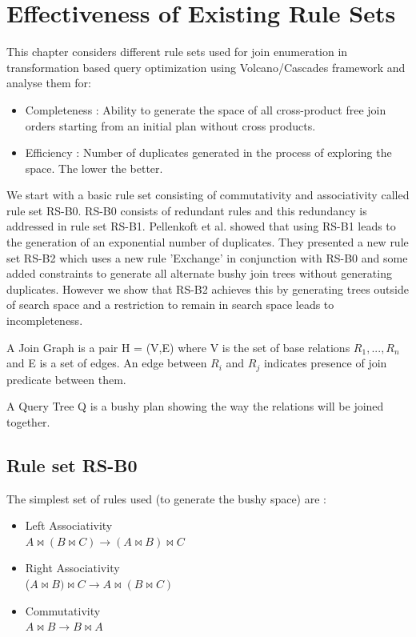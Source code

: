 \chapter{Effectiveness of Existing Rule Sets}
This chapter considers different rule sets used for join enumeration in transformation based query optimization using Volcano/Cascades framework and analyse them for:  
\begin{itemize}
	\item Completeness : Ability to generate the space of all cross-product free join orders starting from an initial plan without cross products.
	\item Efficiency : Number of duplicates generated in the process of exploring the space. The lower the better.
\end{itemize}

We start with a basic rule set consisting of commutativity and associativity called rule set RS-B0. RS-B0 consists of redundant rules  and this redundancy is addressed in rule set RS-B1. Pellenkoft et al.\cite{pellenkoft1997complexity} showed that using RS-B1 leads to the generation of an exponential number of duplicates. They presented a new rule set RS-B2 which uses a new rule 'Exchange' in conjunction with RS-B0 and some added constraints to generate all alternate bushy join trees without generating duplicates. However we show that RS-B2 achieves this by generating trees outside of search space and a restriction to remain in search space leads to incompleteness.

\begin{defn} 
A Join Graph is a pair H = (V,E) where V is the set of base relations $R_{1},...,R_{n}$ and E is a set of edges. An edge between $R_{i}$ and $R_{j}$ indicates presence of join predicate between them. 
\end{defn}

\begin{defn} 
A Query Tree Q is a bushy plan showing the way the relations will be joined together.
\end{defn}

\section{Rule set RS-B0}
The simplest set of rules used (to generate the bushy space) are :

\begin{itemize}
	\item Left Associativity \\ $A \bowtie (B \bowtie C) \rightarrow (A \bowtie B) \bowtie C$
	\item Right Associativity \\ ($A \bowtie B) \bowtie C \rightarrow A \bowtie (B \bowtie C)$
	\item Commutativity \\ $A \bowtie B \rightarrow B \bowtie A$
\end{itemize}

